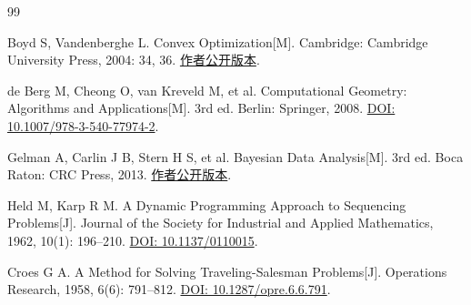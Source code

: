 \documentclass[UTF8,a4paper,12pt]{ctexart}
\begin{document}
\begin{thebibliography}{99}

Boyd S, Vandenberghe L.
Convex Optimization[M].
Cambridge: Cambridge University Press, 2004: 34, 36.
\href{https://web.stanford.edu/~boyd/cvxbook/}{作者公开版本}.

de Berg M, Cheong O, van Kreveld M, et al.
Computational Geometry: Algorithms and Applications[M].
3rd ed. Berlin: Springer, 2008.
\newline
\href{https://doi.org/10.1007/978-3-540-77974-2}{DOI: 10.1007/978-3-540-77974-2}.

Gelman A, Carlin J B, Stern H S, et al.
Bayesian Data Analysis[M].
3rd ed. Boca Raton: CRC Press, 2013.
\href{https://sites.stat.columbia.edu/gelman/book/}{作者公开版本}.

Held M, Karp R M.
A Dynamic Programming Approach to Sequencing Problems[J].
Journal of the Society for Industrial and Applied Mathematics, 1962, 10(1): 196--210.
\href{https://doi.org/10.1137/0110015}{DOI: 10.1137/0110015}.

Croes G A.
A Method for Solving Traveling-Salesman Problems[J].
Operations Research, 1958, 6(6): 791--812.
\href{https://doi.org/10.1287/opre.6.6.791}{DOI: 10.1287/opre.6.6.791}.

\end{thebibliography}
\end{document}
